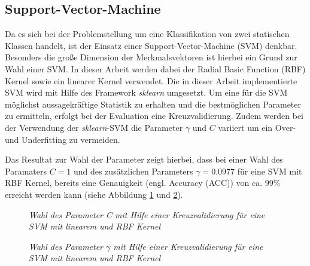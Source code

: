 \subsection{Support-Vector-Machine}
Da es sich bei der Problemstellung um eine Klassifikation von zwei statischen Klassen handelt, ist der Einsatz einer Support-Vector-Machine (SVM) denkbar. Besonders die große Dimension der Merkmalsvektoren ist hierbei ein Grund zur Wahl einer SVM. In dieser Arbeit werden dabei der \glqq Radial Basic Function\grqq{} (RBF) Kernel sowie ein linearer Kernel verwendet.
Die in dieser Arbeit implementierte SVM wird mit Hilfe des Framework \textit{sklearn} umgesetzt. Um eine für die SVM möglichst aussagekräftige Statistik zu erhalten und die bestmöglichen Parameter zu ermitteln, erfolgt bei der Evaluation eine  Kreuzvalidierung. Zudem werden bei der Verwendung der \textit{sklearn}-SVM die Parameter $\gamma$ und $C$ variiert um ein Over- und Underfitting zu vermeiden.

Das Resultat zur Wahl der Parameter zeigt hierbei, dass bei einer Wahl des Paramaters $C=1$ und des zusätzlichen Parameters $\gamma = 0.0977$ für eine SVM mit RBF Kernel, bereits eine Genauigkeit (engl. \glqq Accuracy\grqq{} (ACC)) von ca. 99\% erreicht werden kann (siehe Abbildung \ref{fig:c_chooseSVM} und \ref{fig:gamma_chooseSVM}).

\begin{figure}[h!]
\centering

\caption{\em Wahl des Parameter C mit Hilfe einer Kreuzvalidierung für eine SVM mit linearem und RBF Kernel}
\label{fig:c_chooseSVM}
\end{figure}

\begin{figure}[h!]
\centering

\caption{\em Wahl des Parameter $\gamma$ mit Hilfe einer Kreuzvalidierung für eine SVM mit linearem und RBF Kernel}
\label{fig:gamma_chooseSVM}
\end{figure}
